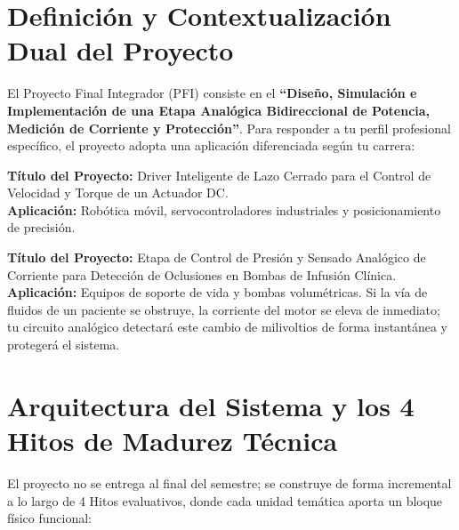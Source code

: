 \documentclass[11pt, a4paper]{article}
\begin{document}
\section{Definición y Contextualización Dual del Proyecto}

El Proyecto Final Integrador (PFI) consiste en el \textbf{``Diseño, Simulación e Implementación de una Etapa Analógica Bidireccional de Potencia, Medición de Corriente y Protección''}. Para responder a tu perfil profesional específico, el proyecto adopta una aplicación diferenciada según tu carrera:

\begin{info}
    \textbf{Título del Proyecto:} Driver Inteligente de Lazo Cerrado para el Control de Velocidad y Torque de un Actuador DC.\\
    \textbf{Aplicación:} Robótica móvil, servocontroladores industriales y posicionamiento de precisión.
\end{info}

\begin{info}
    \textbf{Título del Proyecto:} Etapa de Control de Presión y Sensado Analógico de Corriente para Detección de Oclusiones en Bombas de Infusión Clínica.\\
    \textbf{Aplicación:} Equipos de soporte de vida y bombas volumétricas. Si la vía de fluidos de un paciente se obstruye, la corriente del motor se eleva de inmediato; tu circuito analógico detectará este cambio de milivoltios de forma instantánea y protegerá el sistema.
\end{info}

\section{Arquitectura del Sistema y los 4 Hitos de Madurez Técnica}

El proyecto no se entrega al final del semestre; se construye de forma incremental a lo largo de 4 Hitos evaluativos, donde cada unidad temática aporta un bloque físico funcional:
\end{document}

